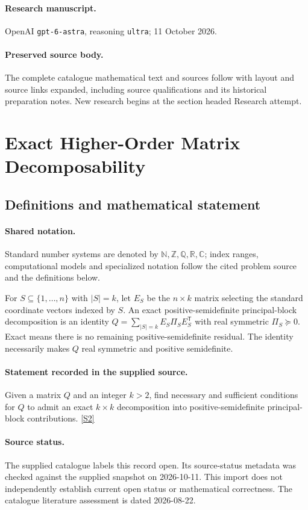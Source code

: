 \documentclass[11pt]{article}
\begin{document}
\paragraph{Research manuscript.} OpenAI \texttt{gpt-6-astra}, reasoning \texttt{ultra}; 11 October 2026.
\paragraph{Preserved source body.} The complete catalogue mathematical text and sources follow with layout and source links expanded, including source qualifications and its historical preparation notes. New research begins at the section headed Research attempt.

\section{Exact Higher-Order Matrix Decomposability}\label{statement}

\subsection{Definitions and mathematical statement}

\paragraph{Shared notation.}Standard number systems are denoted by $\mathbb N,\mathbb Z,\mathbb Q,\mathbb R,\mathbb C$; index ranges, computational models and specialized notation follow the cited problem source and the definitions below.


For $S\subseteq\{1,\ldots,n\}$ with $|S|=k$, let $E_S$ be the $n\times k$ matrix selecting the standard coordinate vectors indexed by $S$. An exact positive-semidefinite principal-block decomposition is an identity $Q=\sum_{|S|=k}E_S\Pi_SE_S^{\mathsf T}$ with real symmetric $\Pi_S\succeq0$. Exact means there is no remaining positive-semidefinite residual. The identity necessarily makes $Q$ real symmetric and positive semidefinite.
\paragraph{Statement recorded in the supplied source.}
Given a matrix $Q$ and an integer $k>2$, find necessary and sufficient conditions for $Q$ to admit an exact $k\times k$ decomposition into positive-semidefinite principal-block contributions. \href{https://doi.org/10.4171/owr/2019/26}{[S2]}
\paragraph{Source status.}
The supplied catalogue labels this record open. Its source-status metadata was checked against the supplied snapshot on 2026-10-11. This import does not independently establish current open status or mathematical correctness. The catalogue literature assessment is dated 2026-08-22.
\end{document}
